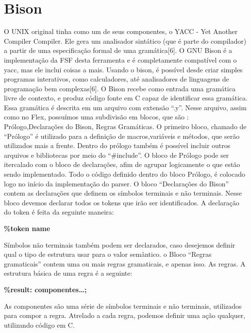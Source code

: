 \section{Bison}
O UNIX original tinha como um de seus componentes, o YACC - Yet Another Compiler Compiler. Ele gera um analisador sintático (que é parte do compilador) a partir de uma especificação formal de uma gramática[6].
O GNU Bison é a implementação da FSF desta ferramenta e é completamente compatível com o yacc, mas ele inclui coisas a mais. Usando o bison, é possível desde criar simples programas interativos, como calculadores, até analisadores de linguagens de programação bem complexas[6].
O Bison recebe como entrada uma gramática livre de contexto, e produz código fonte em C capaz de identificar essa gramática.  Essa gramática é descrita em um arquivo com extensão “.y”. Nesse arquivo, assim como no Flex, possuímos uma subdivisão em blocos, que são : Prólogo,Declarações do Bison, Regras Gramáticas.
O primeiro bloco, chamado de “Prólogo” é utilizado para a definição de macros,variáveis e métodos, que serão utilizados mais a frente. Dentro do prólogo também é possível incluir outros arquivos e bibliotecas por meio do “\#include”. O bloco de Prólogo pode ser itercalado com o bloco de declarações, afim de agrupar logicamente o que estão sendo implementado. Todo o código definido dentro do bloco Prólogo, é colocado logo no início da implementação do parser. 
O bloco “Declarações do Bison” contem as declarações que definem os símbolos terminais e não terminais. Nesse bloco devemos declarar todos os tokens que irão ser identificados. A declaração do token é feita da seguinte maneira:

\textbf{\%token name}

 Símbolos não terminais também podem ser declarados, caso desejemos definir qual o tipo de estrutura usar para o valor semântico.
o Bloco “Regras gramaticais” contem uma ou mais regras gramaticais, e apenas isso. As regras. A estrutura básica de uma regra é a seguinte:

\textbf{\%result: componentes…;}

As componentes são uma série de símbolos terminais e não terminais, utilizados para compor a regra. Atrelado a cada regra, podemos definir uma ação qualquer, utilizando código em C.